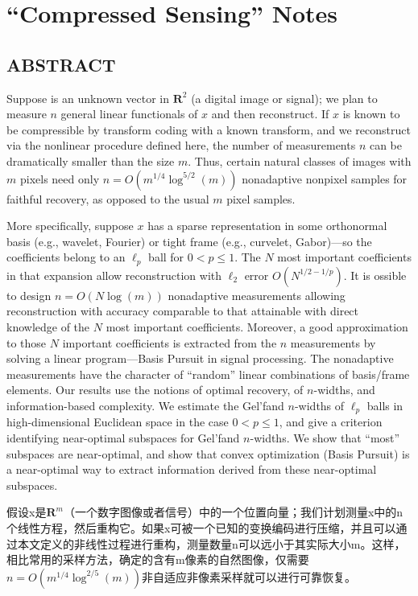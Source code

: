 \chapter{``Compressed Sensing'' Notes}
\label{chapter3}
\section{ABSTRACT}
Suppose is an unknown vector in $\mathbf{R}^2$ (a digital image or signal); we plan to measure $n$ general linear functionals of $x$ and then reconstruct. If $x$ is known to be compressible by transform coding with a known transform, and we reconstruct via the nonlinear procedure defined here, the number of measurements $n$ can be dramatically smaller than the size $m$. Thus, certain natural classes of images with $m$ pixels need only $n = O(m^{1/4}\log^{5/2}(m))$ nonadaptive nonpixel samples for faithful recovery, as opposed to the usual $m$ pixel samples.

More specifically, suppose $x$ has a sparse representation in some orthonormal basis (e.g., wavelet, Fourier) or tight frame (e.g., curvelet, Gabor)—so the coefficients belong to an $\ell_p$ ball for $0<p \leq 1$. The $N$ most important coefficients in that expansion allow reconstruction with $\ell_2$ error $O(N^{1/2-1/p})$. It is ossible to design \textcolor[rgb]{1,0,0}{$n=O(N\log(m))$ nonadaptive measurements} allowing reconstruction with accuracy comparable to that attainable with direct knowledge of the $N$ most important coefficients. Moreover, a good approximation to those $N$ important coefficients is extracted from the $n$ measurements by solving a linear program—Basis Pursuit in signal processing. The nonadaptive measurements have the character of “random” linear combinations of basis/frame elements. Our results use the notions of optimal recovery, of $n$-widths, and information-based complexity. We estimate the Gel'fand $n$-widths of $\ell_p$ balls in high-dimensional Euclidean space in the case $0<p \leq 1$, and give a criterion identifying near-optimal subspaces for Gel'fand $n$-widths. We show that “most” subspaces are near-optimal, and show that convex optimization (Basis Pursuit) is a near-optimal way to extract information derived from these near-optimal subspaces.

    假设x是$\mathbf{R}^m$（一个数字图像或者信号）中的一个位置向量；我们计划测量x中的n个线性方程，然后重构它。如果x可被一个已知的变换编码进行压缩，并且可以通过本文定义的非线性过程进行重构，测量数量n可以远小于其实际大小m。这样，相比常用的采样方法，确定的含有m像素的自然图像，仅需要$n=O(m^{1/4}\log^{2/5}(m))$非自适应非像素采样就可以进行可靠恢复。
	

